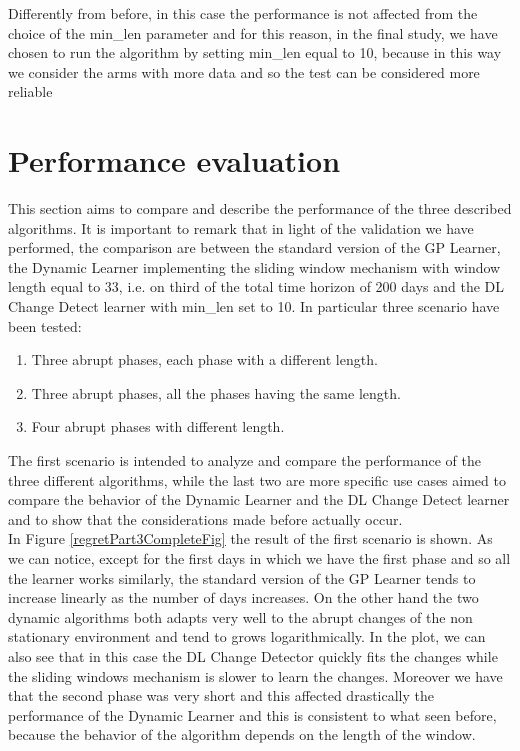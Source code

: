 Differently from before, in this case the performance is not affected from the choice of the min\_len parameter and for this reason, in the final study, we have chosen to run the algorithm by setting min\_len equal to 10, because in this way we consider the arms with more data and so the test can be considered more reliable


\section{Performance evaluation}

This section aims to compare and describe the performance of the three described algorithms.
It is important to remark that in light of the validation we have performed, the comparison are between the standard version of the GP Learner, the Dynamic Learner implementing the sliding window mechanism with window length equal to 33, i.e. on third of the total time horizon of 200 days and the DL Change Detect learner with min\_len set to 10.
In particular three scenario have been tested:

\begin{enumerate}
    \item Three abrupt phases, each phase with a different length.
    \item Three abrupt phases, all the phases having the same length.
    \item Four abrupt phases with different length.
\end{enumerate}

The first scenario is intended to analyze and compare the performance of the three different algorithms, while the last two are more specific use cases aimed to compare the behavior of the Dynamic Learner and the DL Change Detect learner and to show that the considerations made before actually occur.\\
In Figure \ref{regretPart3CompleteFig} the result of the first scenario is shown. As we can notice, except for the first days in which we have the first phase and so all the learner works similarly, the standard version of the GP Learner tends to increase linearly as the number of days increases. On the other hand the two dynamic algorithms both adapts very well to the abrupt changes of the non stationary environment and tend to grows logarithmically. In the plot, we can also see that in this case the DL Change Detector quickly fits the changes while the sliding windows mechanism is slower to learn the changes. Moreover we have that the second phase was very short and this affected drastically the performance of the Dynamic Learner and this is consistent to what seen before, because the behavior of the algorithm depends on the length of the window.

